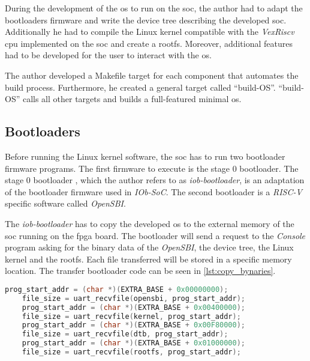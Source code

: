 During the development of the \acrshort{os} to run on the \acrshort{soc}, the author had to adapt the bootloaders firmware and write the device tree describing the developed \acrshort{soc}. Additionally he had to compile the Linux kernel compatible with the \textit{VexRiscv} \acrshort{cpu} implemented on the \acrshort{soc} and create a \acrlong{rootfs}. Moreover, additional features had to be developed for the user to interact with the \acrshort{os}.

The author developed a Makefile target for each component that automates the build process. Furthermore, he created a general target called \enquote{build-OS}. \enquote{build-OS} calls all other targets and builds a full-featured minimal \acrshort{os}.

\subsection{Bootloaders}
Before running the Linux kernel software, the \acrshort{soc} has to run two bootloader firmware programs. The first firmware to execute is the stage 0 bootloader. The stage 0 bootloader , which the author refers to as \textit{iob-bootloader}, is an adaptation of the bootloader firmware used in \textit{IOb-SoC}. The second bootloader is a \textit{RISC-V} specific software called \textit{OpenSBI}.

The \textit{iob-bootloader} has to copy the developed \acrshort{os} to the external memory of the \acrshort{soc} running on the \acrshort{fpga} board. The bootloader will send a request to the \textit{Console} program asking for the binary data of the \textit{OpenSBI}, the device tree, the Linux kernel and the \acrlong{rootfs}. Each file transferred will be stored in a specific memory location. The transfer bootloader code can be seen in \ref{lst:copy_bynaries}.

\begin{lstlisting}[language=c, caption={Transfer \acrshort{os} to the \acrshort{soc} external memmory.}, label=lst:copy_bynaries]
    prog_start_addr = (char *)(EXTRA_BASE + 0x00000000);
    file_size = uart_recvfile(opensbi, prog_start_addr);
    prog_start_addr = (char *)(EXTRA_BASE + 0x00400000);
    file_size = uart_recvfile(kernel, prog_start_addr);
    prog_start_addr = (char *)(EXTRA_BASE + 0x00F80000);
    file_size = uart_recvfile(dtb, prog_start_addr);
    prog_start_addr = (char *)(EXTRA_BASE + 0x01000000);
    file_size = uart_recvfile(rootfs, prog_start_addr);
\end{lstlisting}

